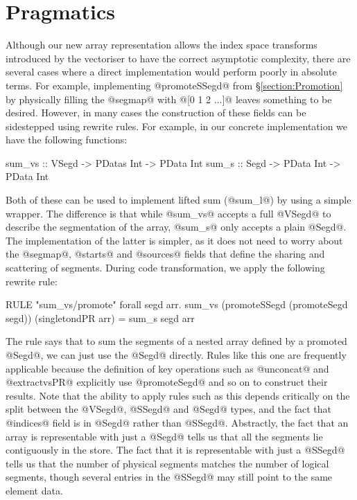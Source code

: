 
\clearpage{}
\section{Pragmatics}
\label{section:Pragmatics}
Although our new array representation allows the index space transforms introduced by the vectoriser to have the correct asymptotic complexity, there are several cases where a direct implementation would perform poorly in absolute terms. For example, implementing @promoteSSegd@ from \S\ref{section:Promotion} by physically filling the @segmap@ with @[0 1 2 ...]@ leaves something to be desired. However, in many cases the construction of these fields can be sidestepped using rewrite rules. For example, in our concrete implementation we have the following functions:
%
\begin{small}
\begin{code}
  sum_vs :: VSegd -> PDatas Int -> PData Int
  sum_s  :: Segd  -> PData  Int -> PData Int
\end{code}
\end{small}
%
\noindent
Both of these can be used to implement lifted sum (@sum_l@) by using a simple wrapper. The difference is that while @sum_vs@ accepts a full @VSegd@ to describe the segmentation of the array,  @sum_s@ only accepts a plain @Segd@. The implementation of the latter is simpler, as it does not need to worry about the @segmap@, @starts@ and @sources@ fields that define the sharing and scattering of segments. During code transformation, we apply the following rewrite rule:
%
\begin{small}
\begin{code}
 RULE "sum_vs/promote"  forall segd arr.
       sum_vs (promoteSSegd (promoteSegd  segd)) 
              (singletondPR arr)       = sum_s segd arr
\end{code}
\end{small}
%
The rule says that to sum the segments of a nested array defined by a promoted @Segd@, we can just use the @Segd@ directly. Rules like this one are frequently applicable because the definition of key operations such as @unconcat@ and @extractvsPR@ explicitly use @promoteSegd@ and so on to construct their results. Note that the ability to apply rules such as this depends critically on the split between the @VSegd@, @SSegd@ and @Segd@ types, and the fact that @indices@ field is in @Segd@ rather than @SSegd@. Abstractly, the fact that an array is representable with just a @Segd@ tells us that all the segments lie contiguously in the store. The fact that it is representable with just a @SSegd@ tells us that the number of physical segments matches the number of logical segments, though several entries in the @SSegd@ may still point to the same element data.

